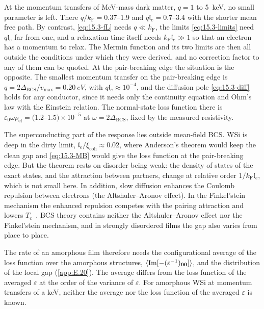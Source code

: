 At the momentum transfers of MeV-mass dark matter, $q = 1$ to \SI{5}{keV}, no small parameter is left. There $q/k_{\mathrm{F}} = 0.37$--1.9 and $q\mathfrak{l}_e = 0.7$--3.4 with the shorter mean free path. By contrast, \cref{eq:15.3-fL} needs $q \ll k_{\mathrm{F}}$, the limits \cref{eq:15.3-limits} need $q\mathfrak{l}_e$ far from one, and a relaxation time itself needs $k_{\mathrm{F}}\mathfrak{l}_e \gg 1$ so that an electron has a momentum to relax. The Mermin function and its two limits are then all outside the conditions under which they were derived, and no correction factor to any of them can be quoted. At the pair-breaking edge the situation is the opposite. The smallest momentum transfer on the pair-breaking edge is $q = 2\Delta_{\mathrm{BCS}}/v_{\mathrm{max}} = \SI{0.20}{eV}$, with $q\mathfrak{l}_e \approx 10^{-4}$, and the diffusion pole \cref{eq:15.3-diff} holds for any conductor, since it needs only the continuity equation and Ohm's law with the Einstein relation. The normal-state loss function there is $\varepsilon_0\omega\rho_{\mathrm{el}} = (1.2$--$1.5)\times10^{-5}$ at $\omega = 2\Delta_{\mathrm{BCS}}$, fixed by the measured resistivity.

The superconducting part of the response lies outside mean-field BCS. WSi is deep in the dirty limit, $\mathfrak{l}_e/\xi_{\mathrm{coh}} \approx 0.02$, where Anderson's theorem would keep the clean gap and \cref{eq:15.3-MB} would give the loss function at the pair-breaking edge. But the theorem rests on disorder being weak: the density of states of the exact states, and the attraction between partners, change at relative order $1/k_{\mathrm{F}}\mathfrak{l}_e$, which is not small here. In addition, slow diffusion enhances the Coulomb repulsion between electrons (the Altshuler--Aronov effect). In the Finkel'stein mechanism the enhanced repulsion competes with the pairing attraction and lowers $T_c$~\cite[Sect.~III.2]{sacepe2020quantum}. BCS theory contains neither the Altshuler--Aronov effect nor the Finkel'stein mechanism, and in strongly disordered films the gap also varies from place to place.

The rate of an amorphous film therefore needs the configurational average of the loss function over the amorphous structures, $\langle\operatorname{Im}[-(\varepsilon^{-1})_{\bm{0}\bm{0}}]\rangle$, and the distribution of the local gap (\cref{app:E.20}). The average differs from the loss function of the averaged $\varepsilon$ at the order of the variance of $\varepsilon$. For amorphous WSi at momentum transfers of a keV, neither the average nor the loss function of the averaged $\varepsilon$ is known.
